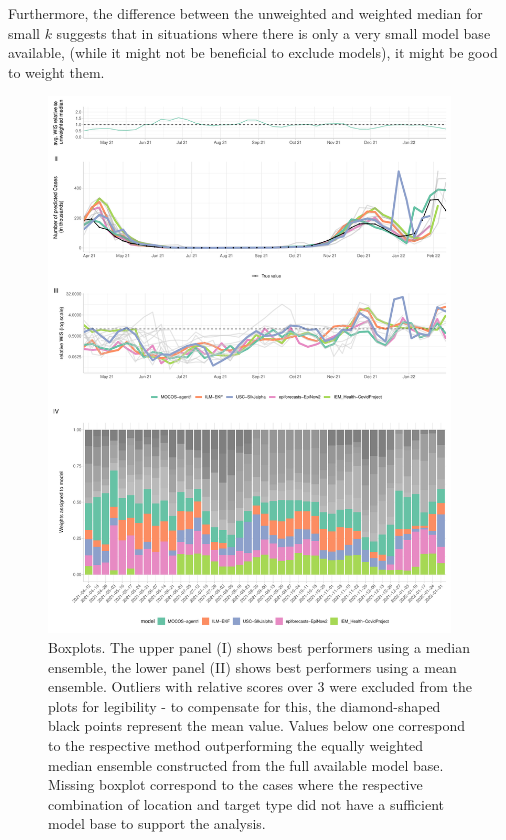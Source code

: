 Furthermore, the difference between the unweighted and weighted median for small $k$ suggests that in situations where there is only a very small model base available, (while it might not be beneficial to exclude models), it might be good to weight them.\\
\begin{figure}
\centering
\includegraphics[width = 0.95\textwidth]{../plots/best_performers_weights_pl}
\caption{Boxplots. The upper panel (I) shows best performers using a median ensemble, the lower panel (II) shows best performers using a mean ensemble. Outliers with relative scores over 3 were excluded from the plots for legibility - to compensate for this, the diamond-shaped black points represent the mean value. Values below one correspond to the respective method outperforming the equally weighted median ensemble constructed from the full available model base. Missing boxplot correspond to the cases where the respective combination of location and target type did not have a sufficient model base to support the analysis.}
\label{fig:bpweights_pl}
\end{figure}
